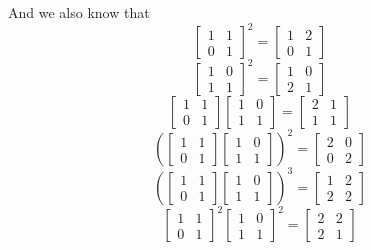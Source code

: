 \documentclass[12pt]{article}
\begin{document}
    And we also know that
    \[ \begin{bmatrix} 1 & 1 \\
        0 & 1 \end{bmatrix}^2
        = \begin{bmatrix} 1 & 2 \\
        0 & 1 \end{bmatrix}  \]
    \[ \begin{bmatrix} 1 & 0 \\
        1 & 1 \end{bmatrix}^2
        = \begin{bmatrix} 1 & 0 \\
        2 & 1 \end{bmatrix}  \]
    \[ \begin{bmatrix} 1 & 1 \\
        0 & 1 \end{bmatrix}
        \begin{bmatrix} 1 & 0 \\
            1 & 1 \end{bmatrix}
        = \begin{bmatrix} 2 & 1 \\
        1 & 1 \end{bmatrix}  \]
    \[ \left(\begin{bmatrix} 1 & 1 \\
        0 & 1 \end{bmatrix}
        \begin{bmatrix} 1 & 0 \\
            1 & 1 \end{bmatrix} \right)^2
        = \begin{bmatrix} 2 & 0 \\
        0 & 2 \end{bmatrix}  \]
    \[ \left(\begin{bmatrix} 1 & 1 \\
        0 & 1 \end{bmatrix}
        \begin{bmatrix} 1 & 0 \\
            1 & 1 \end{bmatrix} \right)^3
        = \begin{bmatrix} 1 & 2 \\
        2 & 2 \end{bmatrix}  \]
    \[ \begin{bmatrix} 1 & 1 \\
        0 & 1 \end{bmatrix}^2
        \begin{bmatrix} 1 & 0 \\
            1 & 1 \end{bmatrix}^2
        = \begin{bmatrix} 2 & 2 \\
        2 & 1 \end{bmatrix}  \]
\end{document}
